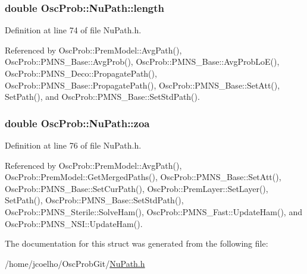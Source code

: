 \subsubsection[{\texorpdfstring{length}{length}}]{\setlength{\rightskip}{0pt plus 5cm}double Osc\+Prob\+::\+Nu\+Path\+::length}\hypertarget{structOscProb_1_1NuPath_af22660894b6e25cf835500381b155557}{}\label{structOscProb_1_1NuPath_af22660894b6e25cf835500381b155557}


Definition at line 74 of file Nu\+Path.\+h.



Referenced by Osc\+Prob\+::\+Prem\+Model\+::\+Avg\+Path(), Osc\+Prob\+::\+P\+M\+N\+S\+\_\+\+Base\+::\+Avg\+Prob(), Osc\+Prob\+::\+P\+M\+N\+S\+\_\+\+Base\+::\+Avg\+Prob\+Lo\+E(), Osc\+Prob\+::\+P\+M\+N\+S\+\_\+\+Deco\+::\+Propagate\+Path(), Osc\+Prob\+::\+P\+M\+N\+S\+\_\+\+Base\+::\+Propagate\+Path(), Osc\+Prob\+::\+P\+M\+N\+S\+\_\+\+Base\+::\+Set\+Att(), Set\+Path(), and Osc\+Prob\+::\+P\+M\+N\+S\+\_\+\+Base\+::\+Set\+Std\+Path().

\subsubsection[{\texorpdfstring{zoa}{zoa}}]{\setlength{\rightskip}{0pt plus 5cm}double Osc\+Prob\+::\+Nu\+Path\+::zoa}\hypertarget{structOscProb_1_1NuPath_af3213f3691ba83c6bc05f4a3490f6b31}{}\label{structOscProb_1_1NuPath_af3213f3691ba83c6bc05f4a3490f6b31}


Definition at line 76 of file Nu\+Path.\+h.



Referenced by Osc\+Prob\+::\+Prem\+Model\+::\+Avg\+Path(), Osc\+Prob\+::\+Prem\+Model\+::\+Get\+Merged\+Paths(), Osc\+Prob\+::\+P\+M\+N\+S\+\_\+\+Base\+::\+Set\+Att(), Osc\+Prob\+::\+P\+M\+N\+S\+\_\+\+Base\+::\+Set\+Cur\+Path(), Osc\+Prob\+::\+Prem\+Layer\+::\+Set\+Layer(), Set\+Path(), Osc\+Prob\+::\+P\+M\+N\+S\+\_\+\+Base\+::\+Set\+Std\+Path(), Osc\+Prob\+::\+P\+M\+N\+S\+\_\+\+Sterile\+::\+Solve\+Ham(), Osc\+Prob\+::\+P\+M\+N\+S\+\_\+\+Fast\+::\+Update\+Ham(), and Osc\+Prob\+::\+P\+M\+N\+S\+\_\+\+N\+S\+I\+::\+Update\+Ham().



The documentation for this struct was generated from the following file\+:\begin{DoxyCompactItemize}
\item 
/home/jcoelho/\+Osc\+Prob\+Git/\hyperlink{NuPath_8h}{Nu\+Path.\+h}\end{DoxyCompactItemize}
